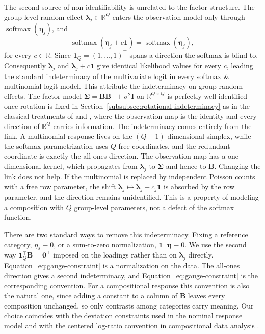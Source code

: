 The second source of non-identifiability is unrelated to the factor structure. The group-level random effect $\bm{\lambda}_j\in\mathbb{R}^Q$ enters the observation model only through $\operatorname{softmax}(\bm{\eta}_j)$, and
\begin{equation*}
\operatorname{softmax}(\bm{\eta}_j+c\mathbf{1})=\operatorname{softmax}(\bm{\eta}_j),
\end{equation*}
for every $c\in\mathbb{R}$. Since $\mathbf{1}_Q=(1,\ldots,1)^\top$ spans a direction the softmax is blind to. Consequently $\bm{\lambda}_j$ and $\bm{\lambda}_j+c\mathbf{1}$ give identical likelihood values for every $c$, leading the standard indeterminacy of the multivariate logit in every softmax \& multinomial-logit model. This attribute the indeterminacy on group random effects. The factor model $\bm{\Sigma}=\mathbf{B}\mathbf{B}^\top+\sigma^2\mathbf{I}$ on $\mathbb{R}^{Q\times Q}$ is perfectly well identified once rotation is fixed in Section~\ref{subsubsec:rotational-indeterminacy} as in the classical treatments of \citet{Rubin1982} and \citet{Tipping1999}, where the observation map is the identity and every direction of $\mathbb{R}^Q$ carries information. The indeterminacy comes entirely from the link. A multinomial response lives on the $(Q-1)$-dimensional simplex, while the softmax parametrization uses $Q$ free coordinates, and the redundant coordinate is exactly the all-ones direction. The observation map has a one-dimensional kernel, which propagates from $\bm{\lambda}_j$ to $\bm{\Sigma}$ and hence to $\mathbf{B}$. Changing the link does not help. If the multinomial is replaced by independent Poisson counts with a free row parameter, the shift $\bm{\lambda}_j\mapsto\bm{\lambda}_j+c_j\mathbf{1}$ is absorbed by the row parameter, and the direction remains unidentified. This is a property of modeling a composition with $Q$ group-level parameters, not a defect of the softmax function.

There are two standard ways to remove this indeterminacy. Fixing a reference category, $\eta_{s}\equiv0$, or a sum-to-zero normalization, $\mathbf{1}^\top\bm{\eta}\equiv0$. We use the second way $\mathbf{1}_{Q}^{\top}\mathbf{B}=\mathbf{0}^{\top}$ imposed on the loadings rather than on $\bm{\lambda}_{j}$ directly. Equation~\eqref{eq:gauge-constraint} is a normalization on the data. The all-ones direction gives a second indeterminacy, and Equation~\eqref{eq:gauge-constraint} is the corresponding convention. For a compositional response this convention is also the natural one, since adding a constant to a column of $\mathbf{B}$ leaves every composition unchanged, so only contrasts among categories carry meaning. Our choice coincides with the deviation constraints used in the nominal response model \citep{Bock1972} and with the centered log-ratio convention in compositional data analysis \citep{Aitchison1982,Aitchison1986}.

